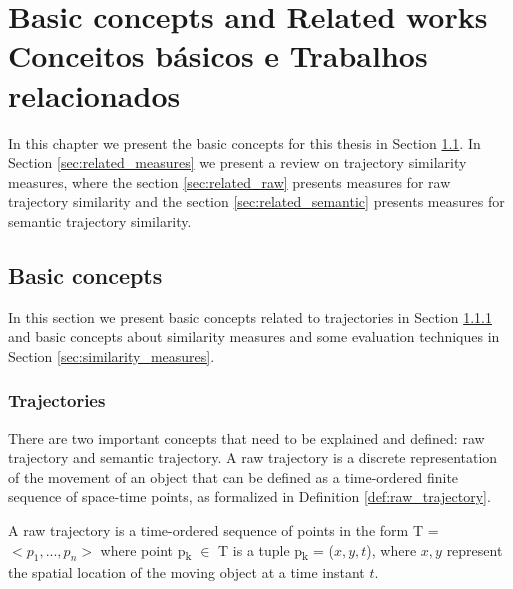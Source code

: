 

\chapter[\lang{Basic concepts and Related works}{Conceitos básicos e Trabalhos relacionados}]
{
    \lang
    {Basic concepts and Related works}
    {Conceitos básicos e Trabalhos relacionados}
}
\label{sec:related}

\begin{flushright}
    \englishword{ }
\end{flushright}


In this chapter we present the basic concepts for this thesis in Section \ref{sec:basic_concepts}. In Section \ref{sec:related_measures} we present a review on trajectory similarity measures, where the section \ref{sec:related_raw} presents measures for raw trajectory similarity and the section \ref{sec:related_semantic} presents measures for semantic trajectory similarity.

\section{Basic concepts} \label{sec:basic_concepts}
In this section we present basic concepts related to trajectories in Section \ref{sec:trajectories} and basic concepts about similarity measures and some evaluation techniques in Section \ref{sec:similarity_measures}.

\subsection{Trajectories}\label{sec:trajectories}
There are two important concepts that need to be explained and defined: raw trajectory and semantic trajectory.
A raw trajectory is a discrete representation of the movement of an object that can be defined as a time-ordered finite sequence of space-time points, as formalized in Definition \ref{def:raw_trajectory}. 

\begin{definition} \label{def:raw_trajectory}
A raw trajectory is a time-ordered sequence of points in the form T = $<p_1,...,p_n>$ where point p\textsubscript{k} $\in$ T is a tuple p\textsubscript{k} = ($x,y,t$), where $x,y$ represent the spatial location of the moving object at a time instant $t$.
\end{definition}

